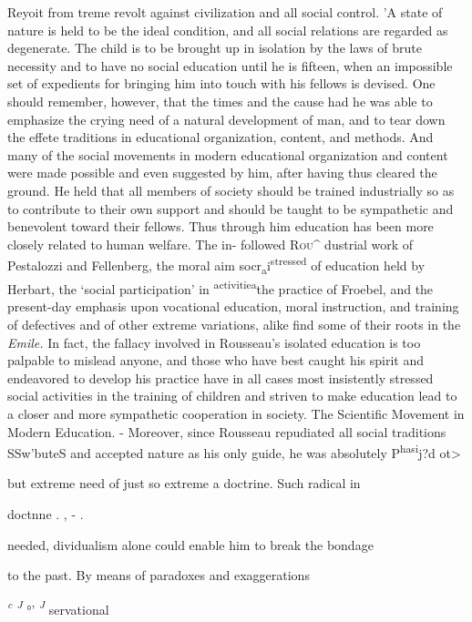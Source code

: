 \documentclass[
]{book}
\begin{document}
Reyoit from treme revolt against civilization and all social control. 'A state of nature is held to be the ideal condition, and all social relations are regarded as degenerate. The child is to be brought up in isolation by the laws of brute necessity and to have no social education until he is fifteen, when an impossible set of expedients for bringing him into touch with his fellows is devised. One should remember, however, that the times and the cause had\protect\hypertarget{ch19.xmlux5cux23para.276.1.0.box.151.236.1266.1392.q.60}{}{ he was able to emphasize the crying need of a natural development of man, and to tear down the effete traditions in educational organization, content, and methods. And many of the social movements in modern educational organization and content were made possible and even suggested by him, after having thus cleared the ground. He held that all members of society should be trained industrially so as to contribute to their own support and should be taught to be sympathetic and benevolent toward their fellows. Thus through him education has been more closely related to human welfare. The in- followed \textsc{Rou\^{} }dustrial work of Pestalozzi and Fellenberg, the moral aim socr\textsubscript{a}i\textsuperscript{stressed} of education held by Herbart, the `social participation' in \textsuperscript{activitiea}the practice of Froebel, and the present-day emphasis upon vocational education, moral instruction, and training of defectives and of other extreme variations, alike find some of their roots in the \emph{Emile.} In fact, the fallacy involved in Rousseau's isolated education is too palpable to mislead anyone, and those who have best caught his spirit and endeavored to develop his practice have in all cases most insistently stressed social activities in the training of children and striven to make education lead to a closer and more sympathetic cooperation in society. The Scientific Movement in Modern Education. - Moreover, since Rousseau repudiated all social traditions SSw'buteS and accepted nature as his only guide, he was absolutely P\textsuperscript{hasi}j?d ot\textgreater{}}

but extreme need of just so extreme a doctrine. Such radical in

doctnne . , - .

needed, dividualism alone could enable him to break the bondage

to the past. By means of paradoxes and exaggerations

\emph{\textsuperscript{c} \textsuperscript{J}} °' \emph{\textsuperscript{J}} servational
\end{document}
